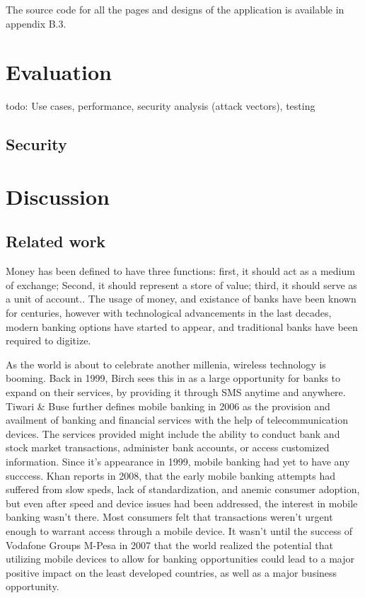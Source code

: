 \documentclass[11pt, a4paper]{article}
\begin{document}
The source code for all the pages and designs of the application is available in appendix B.3.


\section{Evaluation}
{\color{red} todo: Use cases, performance, security analysis (attack vectors), testing}
\subsection{Security} %
\label{sub:security}

\section{Discussion}
\subsection{Related work} %
\label{sub:related_work}

Money has been defined to have three functions: first, it should act as a medium of exchange; Second, it should represent a store of value; third, it should serve as a unit of account.\cite{carruthers}. The usage of money, and existance of banks have been known for centuries, however with technological advancements in the last decades, modern banking options have started to appear, and traditional banks have been required to digitize.

As the world is about to celebrate another millenia, wireless technology is booming. Back in 1999, Birch\cite{Birch1999MobileFS} sees this in as a large opportunity for banks to expand on their services, by providing it through SMS anytime and anywhere. Tiwari \& Buse\cite{tiwaribuse} further defines mobile banking in 2006 as the provision and availment of banking and financial services with the help of telecommunication devices. The services provided might include the ability to conduct bank and stock market transactions, administer bank accounts, or access customized information. Since it's appearance in 1999, mobile banking had yet to have any succcess. Khan\cite{khan} reports in 2008, that the early mobile banking attempts had suffered from slow speds, lack of standardization, and anemic consumer adoption, but even after speed and device issues had been addressed, the interest in mobile banking wasn't there. Most consumers felt that transactions weren't urgent enough to warrant access through a mobile device. It wasn't until the success of Vodafone Groups M-Pesa in 2007\cite{jacksuri} that the world realized the potential that utilizing mobile devices to allow for banking opportunities could lead to a major positive impact on the least developed countries, as well as a major business opportunity.
\end{document}
